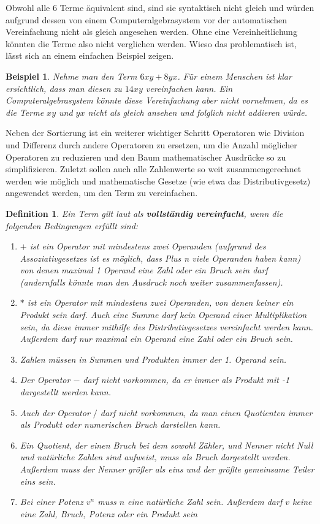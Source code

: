 \documentclass[11pt]{article}
\newtheorem{defin}{Definition}
\newtheorem{example}{Beispiel}
\begin{document}
Obwohl alle 6 Terme äquivalent sind, sind sie syntaktisch nicht gleich und würden aufgrund dessen von einem Computeralgebrasystem
vor der automatischen Vereinfachung nicht als gleich angesehen werden. Ohne eine Vereinheitlichung könnten die Terme also nicht 
verglichen werden.
Wieso das problematisch ist, lässt sich an einem einfachen Beispiel zeigen.

\begin{example}
  Nehme man den Term $6xy+8yx$. Für einem Menschen ist klar ersichtlich, dass man diesen zu $14xy$ vereinfachen kann.
  Ein Computeralgebrasystem könnte diese Vereinfachung aber nicht vornehmen, da es die Terme $xy$ und $yx$ nicht als gleich
  ansehen und folglich nicht addieren würde. 
\end{example}

Neben der Sortierung ist ein weiterer wichtiger Schritt Operatoren wie Division und Differenz durch andere Operatoren
zu ersetzen, um die Anzahl möglicher Operatoren zu reduzieren und den Baum mathematischer Ausdrücke so zu simplifizieren. \newline
Zuletzt sollen auch alle Zahlenwerte so weit zusammengerechnet werden wie möglich und mathematische Gesetze 
(wie etwa das Distributivgesetz) angewendet werden, um den Term zu vereinfachen.

\begin{defin}
  Ein Term gilt laut \citeauthor{CAS_EA} \cite[90 92]{CAS_EA} als
  \textbf{vollständig vereinfacht}, wenn die folgenden Bedingungen erfüllt sind:
  \begin{enumerate}
    \item $+$ ist ein Operator mit mindestens zwei Operanden (aufgrund des Assoziativgesetzes ist es möglich, 
          dass Plus n viele Operanden haben kann) von denen maximal 1 Operand eine Zahl oder ein Bruch sein darf 
          (andernfalls könnte man den Ausdruck noch weiter zusammenfassen).
    \item $*$ ist ein Operator mit mindestens zwei Operanden, von denen keiner ein Produkt sein darf. 
          Auch eine Summe darf kein Operand einer Multiplikation sein, da diese immer mithilfe des Distributivgesetzes
          vereinfacht werden kann.
          Außerdem darf nur maximal ein Operand eine Zahl oder ein Bruch sein. 
    \item Zahlen müssen in Summen und Produkten immer der 1. Operand sein.
    \item Der Operator $-$ darf nicht vorkommen, da er immer als Produkt mit -1 dargestellt werden kann.
    \item Auch der Operator $/$ darf nicht vorkommen, da man einen Quotienten immer als Produkt oder numerischen Bruch darstellen kann.
    \item Ein Quotient, der einen Bruch bei dem sowohl Zähler, und Nenner nicht Null und natürliche Zahlen sind aufweist, 
          muss als Bruch dargestellt werden. Außerdem muss der Nenner größer als eins und der größte gemeinsame Teiler eins sein.
    \item Bei einer Potenz $v^n$ muss $n$ eine natürliche Zahl sein. Außerdem darf $v$ keine eine Zahl, Bruch, Potenz oder ein Produkt sein
  \end{enumerate}
\end{defin}
\end{document}
